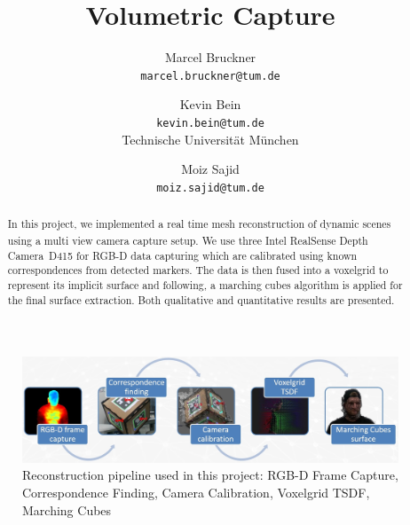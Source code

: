 \documentclass[10pt,twocolumn,letterpaper]{article}
\begin{document}
\title{Volumetric Capture}

\author{Marcel Bruckner\\
{\tt\small marcel.bruckner@tum.de}
\and
Kevin Bein\\
{\tt\small kevin.bein@tum.de}\\[0.5em]
Technische Universit\"at M\"unchen
\and
Moiz Sajid\\
{\tt\small moiz.sajid@tum.de}
}

\maketitle

\newcommand{\intel}{Intel\textsuperscript{\textcopyright}}
\newcommand{\fref}[1]{\mbox{Figure~\ref{#1}}}
\newcommand{\tref}[1]{\mbox{Table~\ref{#1}}}
\newcommand{\sref}[1]{\mbox{Section~\ref{#1}}}
\newcommand{\rscamera}{\intel{} RealSense\texttrademark{} Depth Camera~D415 \cite{DepthCameraD415}}
\newcommand{\aruco}{ArUco~markers~\cite{ArUco}}
\newcommand{\charuco}{ChArUco~markers~\cite{ChArUco}}
\newcommand{\opencv}{OpenCV~\cite{OpenCV}}
\newcommand{\opengl}{OpenGL~\cite{OpenGL}}

\begin{abstract}
   In this project, we implemented a real time mesh reconstruction of dynamic scenes using a multi view camera capture setup. We use three \rscamera{} for RGB-D data capturing which are calibrated using known correspondences from detected markers. The data is then fused into a voxelgrid to represent its implicit surface and following, a marching cubes algorithm is applied for the final surface extraction. Both qualitative and quantitative results are presented.   
\end{abstract}


\begin{figure}[t]
	\begin{center}
		\includegraphics[width=1.0\linewidth]{imgs/pipeline}
	\end{center}
	\caption{Reconstruction pipeline used in this project: RGB-D Frame Capture, Correspondence Finding, Camera Calibration, Voxelgrid TSDF, Marching Cubes}
	\label{fig:reconstruction-pipeline}
\end{figure}
\end{document}
